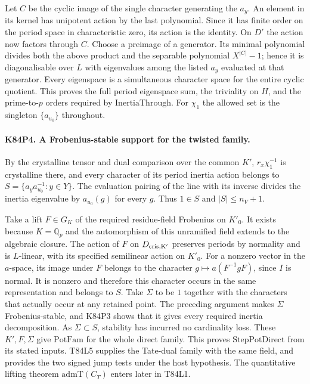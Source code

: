 Let $C$ be the cyclic image of the single character generating
the $a_y$. An element in its kernel has unipotent action by the
last polynomial. Since it has finite order on the period space
in characteristic zero, its action is the identity. On $D'$
the action now factors through $C$. Choose a preimage of a
generator. Its minimal polynomial divides both the above
product and the separable polynomial $X^{|C|}-1$; hence it is
diagonalisable over $L$ with eigenvalues among the listed
$a_y$ evaluated at that generator. Every eigenspace is a
simultaneous character space for the entire cyclic quotient.
This proves the full period eigenspace sum, the triviality on
$H$, and the prime-to-$p$ orders required by
$\mathrm{InertiaThrough}$. For $\chi_1$ the allowed set is
the singleton $\{a_{u_0}\}$ throughout.

\paragraph{K84P4. A Frobenius-stable support for the twisted family.}
By the crystalline tensor and dual comparison over the common
$K'$, $r_x\chi_1^{-1}$ is crystalline there, and every character
of its period inertia action belongs to
$S=\{a_ya_{u_0}^{-1}:y\in Y\}$. The evaluation pairing of the
line with its inverse divides the inertia eigenvalue by
$a_{u_0}(g)$ for every $g$. Thus $1\in S$ and $|S|\le n_V+1$.

Take a lift $F\in G_K$ of the required residue-field Frobenius on
$K'_0$. It exists because $K=\mathbb Q_p$ and the automorphism of
this unramified field extends to the algebraic closure. The action
of $F$ on $D_{\rm cris,K'}$ preserves periods by normality
and is $L$-linear, with its specified semilinear action on $K'_0$.
For a nonzero vector in the $a$-space, its image under $F$ belongs
to the character $g\mapsto a(F^{-1}gF)$, since $I$ is normal.
It is nonzero and therefore this character occurs in the same
representation and belongs to $S$. Take $\Sigma$ to be $1$
together with the characters that actually occur at any retained
point. The preceding argument makes $\Sigma$ Frobenius-stable,
and K84P3 shows that it gives every required inertia decomposition.
As $\Sigma\subset S$, stability has incurred no cardinality loss.
These $K',F,\Sigma$ give $\mathrm{PotFam}$ for the whole direct
family. This proves $\mathrm{StepPotDirect}$ from its stated
inputs. T84L5 supplies the Tate-dual family with the same field,
and provides the two signed jump tests under the host hypothesis.
The quantitative lifting theorem $\mathrm{admT}(C_T)$ enters
later in T84L1.
